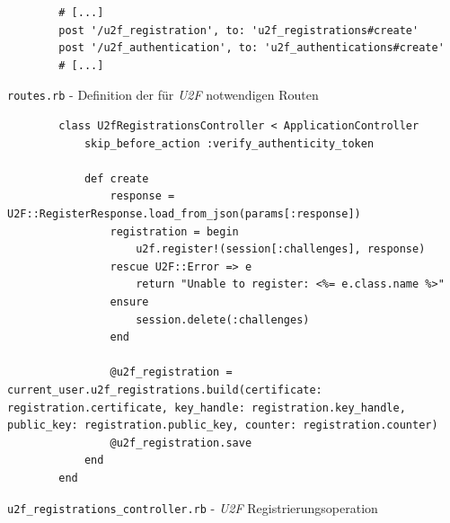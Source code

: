 \documentclass[11pt,a4paper,ngerman]{scrreprt}
\begin{document}
\begin{listing}[htpb]
    \begin{verbatim}
        # [...]
        post '/u2f_registration', to: 'u2f_registrations#create'
        post '/u2f_authentication', to: 'u2f_authentications#create'
        # [...]
    \end{verbatim}
    \caption{\texttt{routes.rb} - Definition der für \textit{U2F} notwendigen Routen}
    \label{lst:routes.rb-u2f}
\end{listing}
\begin{listing}[htpb]
    \begin{verbatim}
        class U2fRegistrationsController < ApplicationController
            skip_before_action :verify_authenticity_token

            def create
                response = U2F::RegisterResponse.load_from_json(params[:response])
                registration = begin
                    u2f.register!(session[:challenges], response)
                rescue U2F::Error => e
                    return "Unable to register: <%= e.class.name %>"
                ensure
                    session.delete(:challenges)
                end

                @u2f_registration = current_user.u2f_registrations.build(certificate:         registration.certificate, key_handle: registration.key_handle, public_key: registration.public_key, counter: registration.counter)                                                                                          
                @u2f_registration.save
            end
        end
    \end{verbatim}
    \caption{\texttt{u2f\_registrations\_controller.rb} - \textit{U2F} Registrierungsoperation}
    \label{lst:u2f_registrations_controller.rb}
\end{listing}
\end{document}
